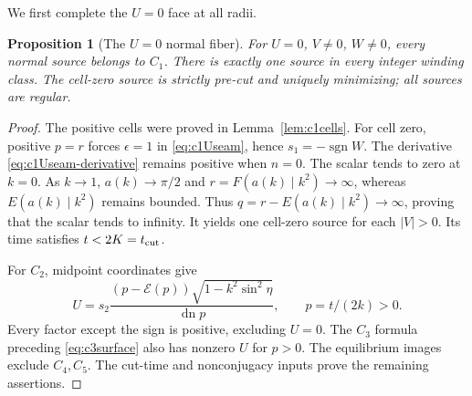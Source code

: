 \documentclass[11pt,a4paper]{article}
\newtheorem{proposition}[theorem]{Proposition}
\theoremstyle{remark}\newtheorem{remark}[theorem]{Remark}
\newcommand{\dn}{\operatorname{dn}}
\begin{document}
We first complete the $U=0$ face at all radii.
\begin{proposition}[The $U=0$ normal fiber]\label{prop:Useam-full}
For $U=0$, $V\ne0$, $W\ne0$, every normal source belongs to $C_1$.
There is exactly one source in every integer winding class.
The cell-zero source is strictly pre-cut and uniquely minimizing;
all sources are regular.
\end{proposition}
\begin{proof}
The positive cells were proved in Lemma~\ref{lem:c1cells}.
For cell zero, positive $p=r$ forces $\epsilon=1$ in
\eqref{eq:c1Useam}, hence $s_1=-\operatorname{sgn}W$.
The derivative \eqref{eq:c1Useam-derivative} remains positive when
$n=0$. The scalar tends to zero at $k=0$.
As $k\to1$, $a(k)\to\pi/2$ and $r=F(a(k)\mid k^2)\to\infty$,
whereas $E(a(k)\mid k^2)$ remains bounded. Thus
$q=r-E(a(k)\mid k^2)\to\infty$, proving that the scalar tends
to infinity. It yields one cell-zero source for each $|V|>0$.
Its time satisfies $t<2K=t_{\rm cut}$.

For $C_2$, midpoint coordinates give
\[
 U=s_2\frac{(p-\mathcal E(p))
            \sqrt{1-k^2\sin^2\eta}}{\dn p},\qquad p=t/(2k)>0.
\]
Every factor except the sign is positive, excluding $U=0$.
The $C_3$ formula preceding \eqref{eq:c3surface} also has nonzero
$U$ for $p>0$. The equilibrium images exclude $C_4,C_5$.
The cut-time and nonconjugacy inputs prove the remaining assertions.
\end{proof}
\end{document}
